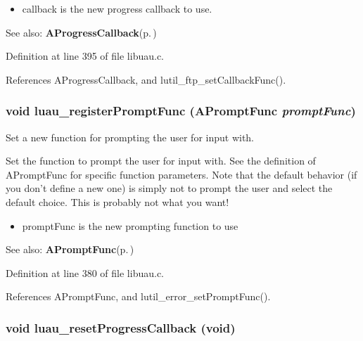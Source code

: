 \begin{itemize}
\item callback is the new progress callback to use.\end{itemize}
\begin{Desc}
\item[See also:]{\bf AProgress\-Callback}{\rm (p.\,\pageref{libuau_8h_a22})} \end{Desc}


Definition at line 395 of file libuau.c.

References AProgress\-Callback, and lutil\_\-ftp\_\-set\-Callback\-Func().
\subsubsection{\setlength{\rightskip}{0pt plus 5cm}void luau\_\-register\-Prompt\-Func ({\bf APrompt\-Func} {\em prompt\-Func})}\label{libuau_8h_a58}


Set a new function for prompting the user for input with. 

Set the function to prompt the user for input with. See the definition of APrompt\-Func for specific function parameters. Note that the default behavior (if you don't define a new one) is simply not to prompt the user and select the default choice. This is probably not what you want!

\begin{itemize}
\item prompt\-Func is the new prompting function to use\end{itemize}
\begin{Desc}
\item[See also:]{\bf APrompt\-Func}{\rm (p.\,\pageref{libuau_8h_a18})} \end{Desc}


Definition at line 380 of file libuau.c.

References APrompt\-Func, and lutil\_\-error\_\-set\-Prompt\-Func().
\subsubsection{\setlength{\rightskip}{0pt plus 5cm}void luau\_\-reset\-Progress\-Callback (void)}\label{libuau_8h_a61}


